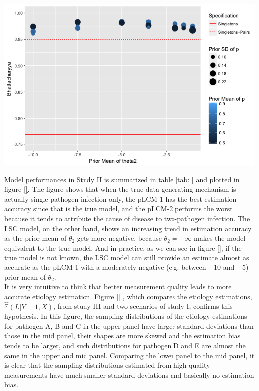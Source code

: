 \documentclass[11 pt, a4paper]{article}  %
\begin{document}
\begin{center}
\includegraphics[scale=0.6]{StudyI.png}
\label{fig:study1}
\end{center}




Model performances in Study II is summarized in table \ref{tab: } and plotted in figure \ref{}. The figure shows that when the true data generating mechanism is actually single pathogen infection only, the pLCM-1 has the best estimation accuracy since that is the true model, and the pLCM-2 performs the worst because it tends to attribute the cause of disease to two-pathogen infection. The LSC model, on the other hand, shows an increasing trend in estimation accuracy as the prior mean of $\theta_2$ gets more negative, because $\theta_2 = -\infty$ makes the model equivalent to the true model. And in practice, as we can see in figure \ref{}, if the true model is not known, the LSC model can still provide an estimate almost as accurate as the pLCM-1 with a moderately negative (e.g. between $-10$ and $-5$) prior mean of $\theta_2$.\\

It is very intuitive to think that better measurement quality leads to more accurate etiology estimation. Figure \ref{} , which compares the etiology estimations, $\hat{\mathbb{E}}(L|Y=1,X)$, from study III and two scenarios of study I, confirms this hypothesis. In this figure, the sampling distributions of the etiology estimations for pathogen A, B and C in the upper panel have larger standard deviations than those in the mid panel, their shapes are more skewed and the estimation bias tends to be larger, and such distributions for pathogen D and E are almost the same in the upper and mid panel. Comparing the lower panel to the mid panel, it is clear that the sampling distributions estimated from high quality measurements have much smaller standard deviations and basically no estimation bias.\\
\end{document}
